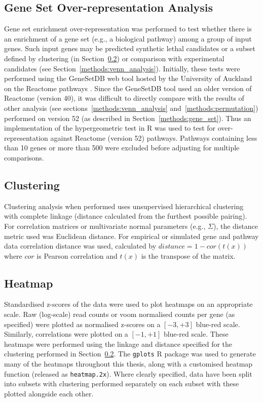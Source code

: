 \subsection{Gene Set Over-representation Analysis} \label{methods:enrichment}
Gene set enrichment over-representation was performed to test whether there is an enrichment of a gene set (e.g., a biological \gls{pathway}) among a group of input genes. Such input genes may be predicted \gls{synthetic lethal} candidates or a subset defined by clustering (in Section~\ref{methods:clustering}) or comparison with experimental candidates (see Section~\ref{methods:venn_analysis}). Initially, these tests were performed using the GeneSetDB web tool \citep{genesetdb} hosted by the University of Auckland on the Reactome \glspl{pathway} \citep{Reactome}. Since the GeneSetDB tool used an older version of Reactome (version 40), it was difficult to directly compare with the results of other analysis (see sections~\ref{methods:venn_analysis} and~\ref{methods:permutation}) performed on version 52 (as described in  Section~\ref{methods:gene_set}). Thus an implementation of the hypergeometric test in R \citep{R_core} was used to test for over-representation against Reactome (version 52) \glspl{pathway}. Pathways containing less than 10 genes or more than 500 \citep[as performed in GeneSetDB by][]{genesetdb} were excluded before adjusting for multiple comparisons.

\subsection{Clustering} \label{methods:clustering}
Clustering analysis when performed uses unsupervised hierarchical clustering with complete linkage (distance calculated from the furthest possible pairing). For correlation matrices or multivariate normal parameters (e.g., $\Sigma$), the distance metric used was Euclidean distance. For empirical or simulated gene and \gls{pathway}  data correlation distance was used, calculated by $distance = 1 - cor(t(x))$ where $cor$ is Pearson correlation and $t(x)$ is the transpose of the  matrix. 

\subsection{Heatmap} \label{methods:heatmap}
Standardised z-scores of the data were used to plot heatmaps on an appropriate scale. Raw (log-scale) read counts or voom normalised counts per gene (as specified) were plotted  as normalised z-scores on a $[-3,+3]$ blue-red scale. Similarly, correlations were plotted on a $[-1,+1]$ blue-red scale. These heatmaps were performed using the linkage and distance specified for the clustering performed in Section~\ref{methods:clustering}. The \texttt{gplots} R package \citep{gplots} was used to generate many of the heatmaps throughout this thesis, along with a customised heatmap function (released as \texttt{heatmap.2x}). Where clearly specified, data have been split into subsets with clustering performed separately on each subset with these plotted alongside each other.

